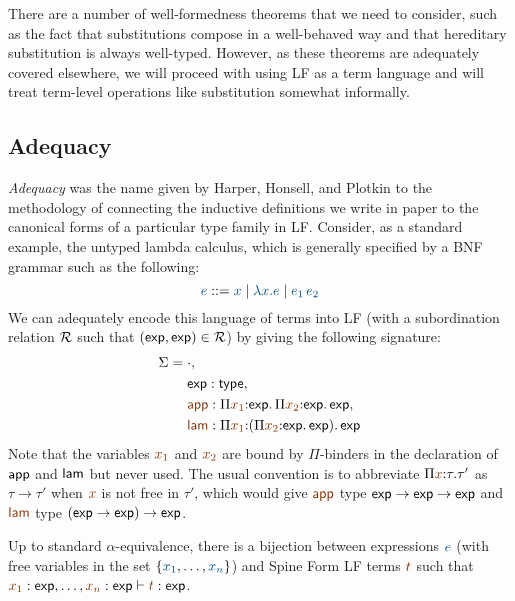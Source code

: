 There are a number of well-formedness theorems that we need to
consider, such as the fact that substitutions compose in a
well-behaved way and that hereditary substitution is always
well-typed.  However, as these theorems are adequately covered
elsewhere, we will proceed with using LF as a term language and will 
treat term-level operations like substitution somewhat informally.

\subsection{Adequacy}

{\it Adequacy} was the name given by Harper, Honsell, and Plotkin to the
methodology of connecting the inductive definitions we write in paper
to the canonical forms of a particular type family in LF. Consider,
as a standard example, the untyped lambda calculus, which is generally
specified by a BNF grammar such as the following:
\[
\obj{e} ::= \obj{x} \mid \obj{\lambda x.e} \mid \obj{e_1\,e_2}
\]
We can adequately encode this language of terms into LF (with a
subordination relation $\mathcal R$ such that $({\sf exp}, {\sf
  exp}) \in \mathcal R$) by giving the following signature:
\begin{align*}
\Sigma & = \cdot, 
\\
 & ~\quad {\sf exp} : {\sf type}, 
\\
 & ~\quad \lf{\sf app} : 
     \lfpi{x_1}{{\sf exp}}{\,\lfpi{x_2}{\sf exp}{\,\sf exp}},
\\
 & ~\quad \lf{\sf lam} : 
     \lfpi{x_1}{(\lfpi{x_2}{\sf exp}{\,\sf exp})}{\,\sf exp}
\end{align*}
Note that the variables $\lf{x_1}$ and $\lf{x_2}$ are bound by
$\Pi$-binders in the declaration of ${\sf app}$ and ${\sf lam}$ but
never used. The usual convention is to abbreviate
$\lfpi{x}{\tau}{\tau'}$ as $\tau \rightarrow \tau'$ when $\lf{x}$ is
not free in $\tau'$, which would give $\lf{\sf app}$ type ${\sf exp}
\rightarrow {\sf exp} \rightarrow {\sf exp}$ and $\lf{\sf lam}$ type
$({\sf exp} \rightarrow {\sf exp}) \rightarrow {\sf exp}$.

\bigskip
\begin{theorem}
  Up to standard $\alpha$-equivalence, there is a bijection between
  expressions $\obj{e}$ (with free variables in the set
  $\{\obj{x_1},\ldots,\obj{x_n}\}$) and Spine Form LF terms $\lf{t}$ such
  that $\lf{x_1}: \mathsf{exp}, \ldots, \lf{x_n}:\mathsf{exp} \vdash
  \lf{t} : \mathsf{exp}$. 
\end{theorem}

